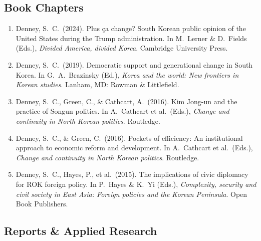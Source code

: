 \documentclass[11pt, a4paper]{article}
\begin{document}
\subsection{Book Chapters}

\begin{enumerate}[itemsep=0.15em]
  \item Denney, S.\ C.\ (2024). Plus \c{c}a change? South Korean public opinion of the United States during the Trump administration. In M.\ Lerner \& D.\ Fields (Eds.), \textit{Divided America, divided Korea}. Cambridge University Press.

  \item Denney, S.\ C.\ (2019). Democratic support and generational change in South Korea. In G.\ A.\ Brazinsky (Ed.), \textit{Korea and the world: New frontiers in Korean studies}. Lanham, MD: Rowman \& Littlefield.

  \item Denney, S.\ C., Green, C., \& Cathcart, A.\ (2016). Kim Jong-un and the practice of Songun politics. In A.\ Cathcart et al.\ (Eds.), \textit{Change and continuity in North Korean politics}. Routledge.

  \item Denney, S.\ C., \& Green, C.\ (2016). Pockets of efficiency: An institutional approach to economic reform and development. In A.\ Cathcart et al.\ (Eds.), \textit{Change and continuity in North Korean politics}. Routledge.

  \item Denney, S.\ C., Hayes, P., et al.\ (2015). The implications of civic diplomacy for ROK foreign policy. In P.\ Hayes \& K.\ Yi (Eds.), \textit{Complexity, security and civil society in East Asia: Foreign policies and the Korean Peninsula}. Open Book Publishers.
\end{enumerate}

\subsection{Reports \& Applied Research}
\end{document}
